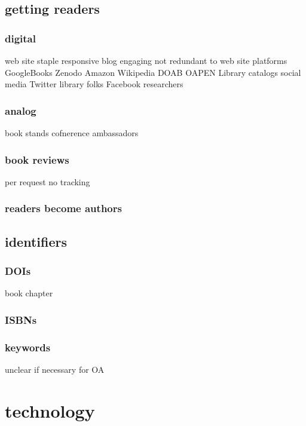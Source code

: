 \documentclass[output=guidelines,guidelines] {langscibook}
\begin{document}
\subsection{getting readers}
\subsubsection{digital}
                    web site
                        staple
                        responsive
                    blog
                        engaging
                        not redundant to web site
                    platforms
                        GoogleBooks
                        Zenodo
                        Amazon
                        Wikipedia
                        DOAB
                        OAPEN
                        Library catalogs
                    social media
                        Twitter
                            library folks
                        Facebook
                            researchers
\subsubsection{analog}
                    book stands
                    cofnerence ambassadors
\subsubsection{book reviews}
                    per request
                    no tracking
\subsubsection{readers become authors}
\subsection{identifiers}
\subsubsection{DOIs}
                    book
                    chapter
\subsubsection{ISBNs}
\subsubsection{keywords }
                    unclear if necessary for OA
\section{technology}
\end{document}
